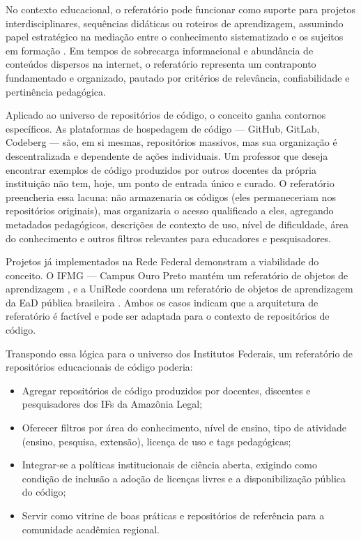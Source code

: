 \documentclass[english, spanish, brazilian]{RBIEarticle}
\begin{document}
	No contexto educacional, o referatório pode funcionar como suporte para projetos interdisciplinares, sequências didáticas ou roteiros de aprendizagem, assumindo papel estratégico na mediação entre o conhecimento sistematizado e os sujeitos em formação \cite{cecead_referatorio}. Em tempos de sobrecarga informacional e abundância de conteúdos dispersos na internet, o referatório representa um contraponto fundamentado e organizado, pautado por critérios de relevância, confiabilidade e pertinência pedagógica.
	
	Aplicado ao universo de repositórios de código, o conceito ganha contornos específicos. As plataformas de hospedagem de código — GitHub, GitLab, Codeberg — são, em si mesmas, repositórios massivos, mas sua organização é descentralizada e dependente de ações individuais. Um professor que deseja encontrar exemplos de código produzidos por outros docentes da própria instituição não tem, hoje, um ponto de entrada único e curado. O referatório preencheria essa lacuna: não armazenaria os códigos (eles permaneceriam nos repositórios originais), mas organizaria o acesso qualificado a eles, agregando metadados pedagógicos, descrições de contexto de uso, nível de dificuldade, área do conhecimento e outros filtros relevantes para educadores e pesquisadores.
	
	Projetos já implementados na Rede Federal demonstram a viabilidade do conceito. O IFMG — Campus Ouro Preto mantém um referatório de objetos de aprendizagem \cite{ifmg_referatorio}, e a UniRede coordena um referatório de objetos de aprendizagem da EaD pública brasileira \cite{unirede_referatorio}. Ambos os casos indicam que a arquitetura de referatório é factível e pode ser adaptada para o contexto de repositórios de código.
	
	Transpondo essa lógica para o universo dos Institutos Federais, um referatório de repositórios educacionais de código poderia:
	\begin{itemize}
		\item Agregar repositórios de código produzidos por docentes, discentes e pesquisadores dos IFs da Amazônia Legal;
		\item Oferecer filtros por área do conhecimento, nível de ensino, tipo de atividade (ensino, pesquisa, extensão), licença de uso e tags pedagógicas;
		\item Integrar-se a políticas institucionais de ciência aberta, exigindo como condição de inclusão a adoção de licenças livres e a disponibilização pública do código;
		\item Servir como vitrine de boas práticas e repositórios de referência para a comunidade acadêmica regional.
	\end{itemize}
	
\end{document}
